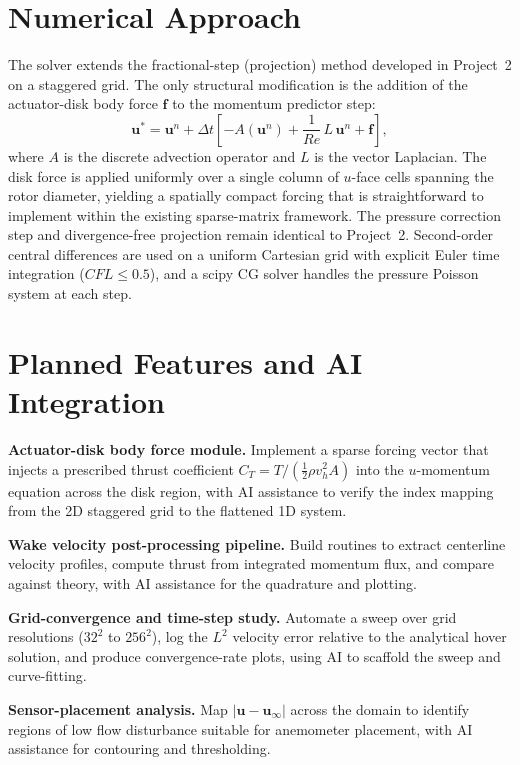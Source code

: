 \documentclass[
  aapm,
  amsmath,amssymb,
  reprint,          %
  floatfix
]{revtex4-2}
\begin{document}
\section{Numerical Approach}

The solver extends the fractional-step (projection) method developed in Project~2
on a staggered grid.  The only structural modification is the addition of the
actuator-disk body force $\mathbf{f}$ to the momentum predictor step:
\begin{equation}
  \mathbf{u}^{*} = \mathbf{u}^{n}
    + \Delta t\!\left[-A(\mathbf{u}^{n})
      + \frac{1}{Re}\,L\,\mathbf{u}^{n} + \mathbf{f}\right],
\end{equation}
where $A$ is the discrete advection operator and $L$ is the vector Laplacian.
The disk force is applied uniformly over a single column of $u$-face cells spanning
the rotor diameter, yielding a spatially compact forcing that is straightforward to
implement within the existing sparse-matrix framework.  The pressure correction step
and divergence-free projection remain identical to Project~2.
Second-order central differences are used on a uniform Cartesian grid with explicit
Euler time integration ($CFL \leq 0.5$), and a scipy CG solver handles the pressure
Poisson system at each step.

\section{Planned Features and AI Integration}

\textbf{Actuator-disk body force module.}
    Implement a sparse forcing vector that injects a prescribed thrust coefficient
    $C_T = T/(\tfrac{1}{2}\rho v_{h}^{2} A)$ into the $u$-momentum equation across
    the disk region, with AI assistance to verify the index mapping
    from the 2D staggered grid to the flattened 1D system.

\textbf{Wake velocity post-processing pipeline.}
    Build routines to extract centerline velocity profiles, compute thrust from
    integrated momentum flux, and compare against theory, with AI assistance for
    the quadrature and plotting.

\textbf{Grid-convergence and time-step study.}
    Automate a sweep over grid resolutions ($32^{2}$ to $256^{2}$), log the
    $L^{2}$ velocity error relative to the analytical hover solution, and produce
    convergence-rate plots, using AI to scaffold the sweep and curve-fitting.

\textbf{Sensor-placement analysis.}
    Map $|\mathbf{u} - \mathbf{u}_{\infty}|$ across the domain to identify
    regions of low flow disturbance suitable for anemometer placement, with
    AI assistance for contouring and thresholding.
\end{document}
